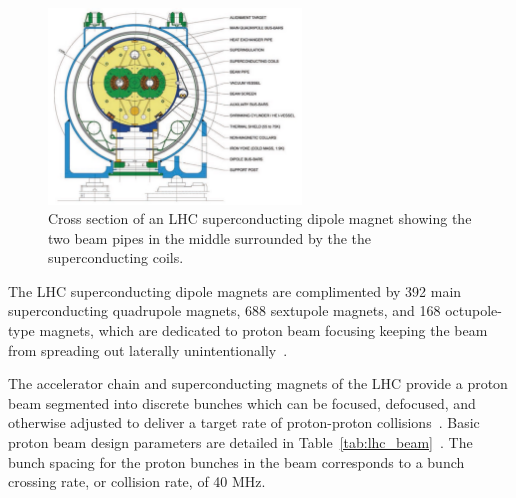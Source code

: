 \begin{figure}[htbp]
\centering
     \includegraphics[width=0.6\textwidth]{cms_and_lhc/plots/lhc_dipole_cross_section.pdf}
     \caption{
Cross section of an LHC superconducting dipole magnet showing the two beam pipes in the middle
surrounded by the the superconducting coils.
     }
     \label{fig:lhc_dipole}
\end{figure}

The LHC superconducting dipole magnets are complimented by 392 main superconducting quadrupole
magnets, 688 sextupole magnets, and 168 octupole-type magnets, which are dedicated to proton 
beam focusing keeping the beam from spreading out laterally unintentionally~\cite{lhc_magnets, Voss:2009zz}. 

The accelerator chain and superconducting magnets of the LHC provide a proton beam segmented
into discrete bunches which can be focused, defocused, and otherwise adjusted to deliver a target
rate of proton-proton collisions~\cite{Benedikt:2004wm}. Basic proton 
beam design parameters are detailed in Table~\ref{tab:lhc_beam}~\cite{Benedikt:2004wm}.
The bunch spacing for the proton bunches in the beam corresponds to a bunch crossing rate,
or collision rate, of 40 MHz.

